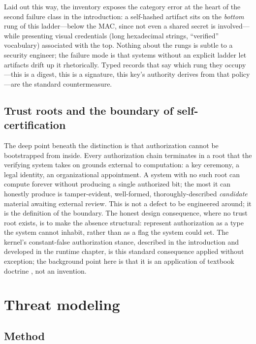 Laid out this way, the inventory exposes the category error at the
heart of the second failure class in the introduction: a self-hashed
artifact sits on the \emph{bottom} rung of this ladder---below the
MAC, since not even a shared secret is involved---while presenting
visual credentials (long hexadecimal strings, ``verified''
vocabulary) associated with the top. Nothing about the rungs is
subtle to a security engineer; the failure mode is that systems
without an explicit ladder let artifacts drift up it rhetorically.
Typed records that say which rung they occupy---this is a digest,
this is a signature, this key's authority derives from that
policy---are the standard countermeasure.

\subsection{Trust roots and the boundary of self-certification}\label{ch02:trustroots}

The deep point beneath the distinction is that authorization cannot
be bootstrapped from inside. Every authorization chain terminates in
a root that the verifying system takes on grounds external to
computation: a key ceremony, a legal identity, an organizational
appointment. A system with no such root can compute forever without
producing a single authorized bit; the most it can honestly produce
is tamper-evident, well-formed, thoroughly-described \emph{candidate}
material awaiting external review. This is not a defect to be
engineered around; it is the definition of the boundary. The honest
design consequence, where no trust root exists, is to make the
absence structural: represent authorization as a type the system
cannot inhabit, rather than as a flag the system could set. The
kernel's constant-false authorization stance, described in the
introduction and developed in the runtime chapter, is this standard
consequence applied without exception; the background point here is
that it is an application of textbook doctrine \cite{anderson}, not
an invention.

\section{Threat modeling}\label{ch02:threats}

\subsection{Method}\label{ch02:threat-method}

